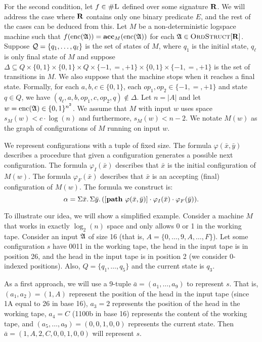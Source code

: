 \vspace{1em}
For the second condition, let $f \in \text{\sc \#L}$ defined over some signature $\mathbf{R}$. We will address the case where $\mathbf{R}$ contains only one binary predicate $E$, and the rest of the cases can be deduced from this. Let $M$ be a non-deterministic logspace machine such that $f({\rm enc}(\mathfrak{A})) = \textbf{acc}_M({\rm enc}(\mathfrak{A}))$ for each $\mathfrak{A} \in \text{\sc OrdStruct}[\mathbf{R}]$. Suppose ${\cal Q} = \{q_1,\ldots,q_{\ell}\}$ is the set of states of $M$, where $q_1$ is the initial state, $q_{\ell}$ is only final state of $M$ and suppose $\Delta \subseteq Q \times \{0,1\} \times \{0,1\} \times Q \times \{-1,=,+1\} \times \{0,1\} \times \{-1,=,+1\}$ is the set of transitions in $M$. We also suppose that the machine stops when it reaches a final state. Formally, for each $a,b,c\in\{0,1\}$, each $op_1,op_2\in\{-1,=,+1\}$ and state $q\in Q$, we have $(q_{\ell},a,b,op_1,c,op_2,q)\not\in\Delta$. Let $n = \vert A \vert$ and let $w = {\rm enc}(\mathfrak{A}) \in \{0,1\}^{n^2}$. We assume that $M$ with input $w$ uses space $s_M(w) < c\cdot\log(n)$ and furthermore, $s_M(w) < n-2$. We notate $M(w)$ as the graph of configurations of $M$ running on input $w$.

We represent configurations with a tuple of fixed size. The formula $\varphi(\bar{x},\bar{y})$ describes a procedure that given a configuration generates a possible next configuration. The formula $\varphi_I(\bar{x})$ describes that $\bar{x}$ is the initial configuration of $M(w)$. The formula $\varphi_F(\bar{x})$ describes that $\bar{x}$ is an accepting (final) configuration of $M(w)$. The formula we construct is:
$$
\alpha = \Sigma{\bar{x}}.\,\Sigma{\bar{y}}.\,([{\bf path} \,\, \varphi(\bar{x},\bar{y})]\cdot \varphi_I(\bar{x})\cdot\varphi_F(\bar{y})).
$$

To illustrate our idea, we will show a simplified example. Consider a machine $M$ that works in exactly $\log_2(n)$ space and only allows 0 or 1 in the working tape. Consider an input $\mathfrak{A}$ of size 16 (that is, $A = \{0,\ldots,9,A,\ldots,F\}$). Let some configuration $s$ have 0011 in the working tape, the head in the input tape is in position 26, and the head in the input tape is in position 2 (we consider 0-indexed positions). Also, $Q = \{q_1,\ldots,q_5\}$ and the current state is $q_3$.

As a first approach, we will use a 9-tuple $\bar{a} = (a_1,\ldots,a_9)$ to represent $s$. That is, $(a_1,a_2) = (1,A)$ represent the position of the head in the input tape (since 1A equal to 26 in base 16), $a_3 = 2$ represents the position of the head in the working tape, $a_4 = C$ (1100b in base 16) represents the content of the working tape, and $(a_5,\ldots,a_9) = (0,0,1,0,0)$ represents the current state. Then $\bar{a} = (1,A,2,C,0,0,1,0,0)$ will represent $s$.

